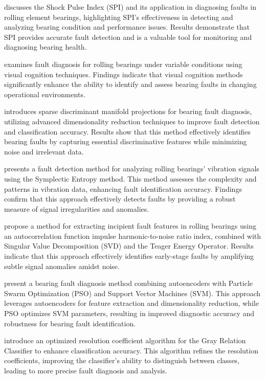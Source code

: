 \documentclass[sn-basic,pdflatex]{sn-jnl}
\theoremstyle{remark}
\theoremstyle{definition}
\begin{document}
\citet{WOS:000398818700108} discusses the Shock Pulse Index (SPI) and
its application in diagnosing faults in rolling element bearings,
highlighting SPI's effectiveness in detecting and analyzing bearing
condition and performance issues. Results demonstrate that SPI provides
accurate fault detection and is a valuable tool for monitoring and
diagnosing bearing health.

\citet{WOS:000404415000016} examines fault diagnosis for rolling
bearings under variable conditions using visual cognition techniques.
Findings indicate that visual cognition methods significantly enhance
the ability to identify and assess bearing faults in changing
operational environments.

\citet{WOS:000401109400020} introduces sparse discriminant manifold
projections for bearing fault diagnosis, utilizing advanced
dimensionality reduction techniques to improve fault detection and
classification accuracy. Results show that this method effectively
identifies bearing faults by capturing essential discriminative features
while minimizing noise and irrelevant data.

\citet{WOS:000419006900041} presents a fault detection method for
analyzing rolling bearings' vibration signals using the Symplectic
Entropy method. This method assesses the complexity and patterns in
vibration data, enhancing fault identification accuracy. Findings
confirm that this approach effectively detects faults by providing a
robust measure of signal irregularities and anomalies.

\citet{WOS:000416794600016} propose a method for extracting incipient
fault features in rolling bearings using an autocorrelation function
impulse harmonic-to-noise ratio index, combined with Singular Value
Decomposition (SVD) and the Teager Energy Operator. Results indicate
that this approach effectively identifies early-stage faults by
amplifying subtle signal anomalies amidst noise.

\citet{WOS:000484465800028} present a bearing fault diagnosis method
combining autoencoders with Particle Swarm Optimization (PSO) and
Support Vector Machines (SVM). This approach leverages autoencoders for
feature extraction and dimensionality reduction, while PSO optimizes SVM
parameters, resulting in improved diagnostic accuracy and robustness for
bearing fault identification.

\citet{WOS:000477760600037} introduce an optimized resolution
coefficient algorithm for the Gray Relation Classifier to enhance
classification accuracy. This algorithm refines the resolution
coefficients, improving the classifier's ability to distinguish between
classes, leading to more precise fault diagnosis and analysis.
\end{document}
